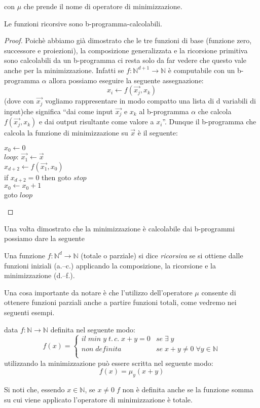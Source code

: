 con $\mu$ che prende il nome di operatore di minimizzazione.
\begin{thm} Le funzioni ricorsive sono b-programma-calcolabili.
\end{thm}
\begin{proof} Poich\`e abbiamo gi\`a dimostrato che le tre funzioni di base
(funzione zero, successore e proiezioni), la composizione generalizzata e la
ricorsione primitiva sono calcolabili da un b-programma ci resta solo da far
vedere che questo vale anche per la minimizzazione. Infatti se
$f:\mathbb{N}^{d+1} \to \mathbb{N}$ \`e computabile con un b-programma $\alpha$
allora possiamo eseguire la seguente assegnazione:
$$x_i \leftarrow f(\vec{x_{j}}, x_k)$$
(dove con $\vec{x_{j}}$ vogliamo rappresentare in modo compatto una lista di d
variabili di input)che significa "`dai come input $\vec{x_{j}}$ e $x_k$ al
b-programma $\alpha$ che calcola $f(\vec{x_{j}}, x_k)$ e dai output risultante
come valore a $x_i$"'. Dunque il b-programma che calcola la funzione di
minimizzazione su $\vec{x}$ \`e il seguente:\\
   \begin{mylisting}
       $x_0 \leftarrow 0$ \\
       $loop$: $\vec{x_{1}} \leftarrow \vec{x}$\\
       $x_{d+2} \leftarrow f(\vec{x_{1}}, x_0)$\\
       if $x_{d+2} = 0$ then goto $stop$\\
       $x_0 \leftarrow x_0 + 1$\\
       goto $loop$
  \end{mylisting}
\end{proof}

Una volta dimostrato che la minimizzazione è calcolabile dai
b-programmi possiamo dare la seguente
\begin{defi} Una funzione $f:\mathbb{N}^{d} \to \mathbb{N}$ (totale o
parziale) si dice \emph{ricorsiva} se si ottiene dalle funzioni
iniziali (a.--c.) applicando la composizione, la ricorsione e la
minimizzazione (d.--f.).
\end{defi}

Una cosa importante da notare \`e che l'utilizzo dell'operatore $\mu$ consente
di ottenere funzioni parziali anche a partire funzioni totali, come vedremo nei
seguenti esempi.
\begin{esempio} data $f:\mathbb{N} \to \mathbb{N}$ definita nel seguente modo:
$$f(x)= \left\{ \begin{array}{ll}
il \; min \; y \; t. \, c. \; x+y=0 & se \; \exists \; y\\
non \; definita & se \; x+y \neq 0 \; \forall y \in \mathbb{N}\\
\end{array} \right.$$
utilizzando la minimizzazione pu\`o essere scritta nel seguente modo:
$$f(x)= \mu_{y}(x+y)$$

Si noti che, essendo $x \in \mathbb{N}$, se $x \neq 0 \; f$ non \`e definita
anche se la funzione somma su cui viene applicato l'operatore di minimizzazione
\`e totale.
\end{esempio}

